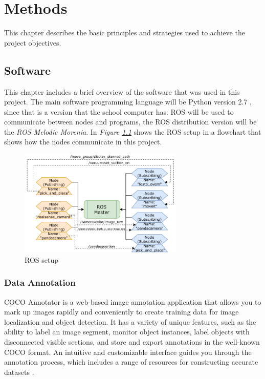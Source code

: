 \chapter{Methods}
This chapter describes the basic principles and strategies used to achieve the project objectives. 
\section{Software}

This chapter includes a brief overview of the software that was used in this project. The main software programming language will be Python version 2.7 \cite{noauthor_python_nodate}, since that is a version that the school computer has. ROS will be used to communicate between nodes and programs, the ROS distribution version will be the \textit{ROS Melodic Morenia}\cite{noauthor_melodic_nodate}. In \textit{Figure \ref{fig:roswork}} shows the ROS setup in a flowchart that shows how the nodes communicate in this project.
\begin{figure}[h]
    \centering
    \includegraphics[width=0.7\textwidth]{graphics/ros.pdf}
    \caption{ROS setup}
    \label{fig:roswork}
\end{figure}


\subsection{Data Annotation}
COCO Annotator is a web-based image annotation application that allows you to mark up images rapidly and conveniently to create training data for image localization and object detection. It has a variety of unique features, such as the ability to label an image segment, monitor object instances, label objects with disconnected visible sections, and store and export annotations in the well-known COCO format. An intuitive and customizable interface guides you through the annotation process, which includes a range of resources for constructing accurate datasets \cite{brooks_jsbrokscoco-annotator_2021}.

